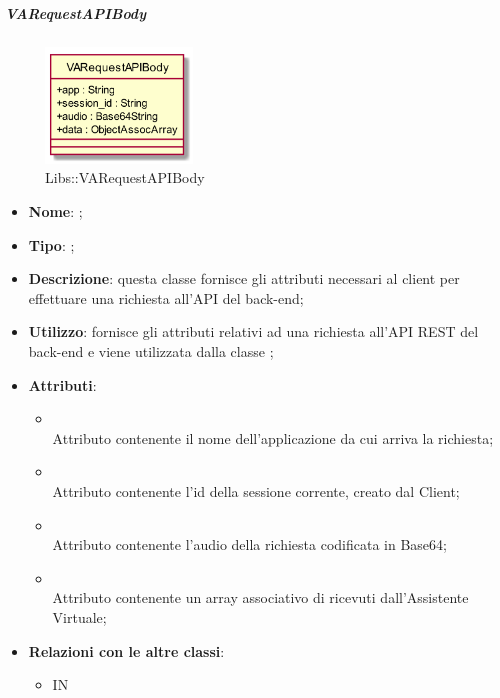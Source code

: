 \hypertarget{VARequestAPIBody_label}{\subparagraph{VARequestAPIBody}}
\begin{figure}[h]
	\centering
	\includegraphics[width=0.35\textwidth,height=\textheight,keepaspectratio]{images/ClassVARequestAPIBody.png}
	\caption{Libs::VARequestAPIBody}
\end{figure}
\begin{itemize}
	\item \textbf{Nome}: ;
	\item \textbf{Tipo}: ;
	\item \textbf{Descrizione}: questa classe fornisce gli attributi necessari al client per effettuare una richiesta all'API  del back-end;
	\item \textbf{Utilizzo}: fornisce gli attributi relativi ad una richiesta all'API REST del back-end e viene utilizzata dalla classe ;
	\item \textbf{Attributi}:
	\begin{itemize}
		\item[]  \\
		Attributo contenente il nome dell'applicazione da cui arriva la richiesta;
		\item[]  \\
		Attributo contenente l'id della sessione corrente, creato dal Client;
		\item[]  \\
		Attributo contenente l'audio della richiesta codificata in Base64;
		\item[]  \\
		Attributo contenente un array associativo di  ricevuti dall'Assistente Virtuale;
	\end{itemize}
	\item \textbf{Relazioni con le altre classi}:
	\begin{itemize}
		\item IN \hyperlink{VocalAPI_label}{}
	\end{itemize}
\end{itemize}
\FloatBarrier

